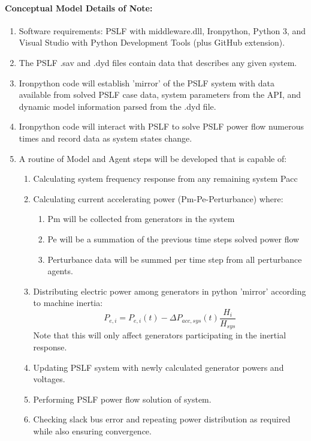 \documentclass[12pt]{article}
\begin{document}
\paragraph{Conceptual Model Details of Note:}
\begin{enumerate}
\item Software requirements: PSLF with middleware.dll, Ironpython, Python 3, and Visual Studio with Python Development Tools (plus GitHub extension).

\item The PSLF .sav and .dyd files contain data that describes any given system.

\item Ironpython code will establish 'mirror' of the PSLF system with data available from solved PSLF case data, system parameters from the API, and dynamic model information parsed from the .dyd file.

\item Ironpython code will interact with PSLF to solve PSLF power flow numerous times and record data as system states change.

\item A routine of Model and Agent steps will be developed that is capable of:
	\begin{enumerate}
		\item Calculating system frequency response from any remaining system Pacc
		\item Calculating current accelerating power  (Pm-Pe-Perturbance) where:
		\begin{enumerate}
			\item Pm will be collected from generators in the system
			\item Pe will be a summation of the previous time steps solved power flow
			\item Perturbance data will be summed per time step from all perturbance agents.
		\end{enumerate}
		\item Distributing electric power among generators in python 'mirror' according to machine inertia:
		\[ P_{e,i} = P_{e,i}(t)-\Delta P_{acc,sys}(t)\dfrac{H_{i}}{H_{sys}} \]
		Note that this will only affect generators participating in the inertial response.
		\item Updating PSLF system with newly calculated generator powers and voltages.
		\item Performing PSLF power flow solution of system.
		\item Checking slack bus error and repeating power distribution as required while also ensuring convergence.
		

\end{enumerate}
\end{enumerate}
\end{document}
